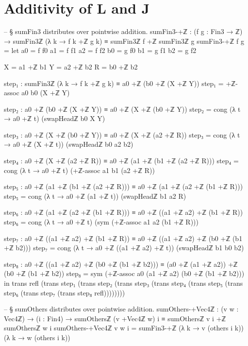 \documentclass[11pt,a4paper]{book}
\def\texorpdfstring#1#2{#2}%
\begin{document}
\section{Additivity of \texorpdfstring{$L$}{L} and \texorpdfstring{$J$}{J}}

\begin{code}
-- § sumFin3 distributes over pointwise addition.
sumFin3-+ℤ : (f g : Fin3 → ℤ) →
  sumFin3ℤ (λ k → f k +ℤ g k) ≡
  sumFin3ℤ f +ℤ sumFin3ℤ g
sumFin3-+ℤ f g =
  let
    a0 = f f0
    a1 = f f1
    a2 = f f2
    b0 = g f0
    b1 = g f1
    b2 = g f2

    X = a1 +ℤ b1
    Y = a2 +ℤ b2
    R = b0 +ℤ b2

    step₁ : sumFin3ℤ (λ k → f k +ℤ g k) ≡ a0 +ℤ (b0 +ℤ (X +ℤ Y))
    step₁ = +ℤ-assoc a0 b0 (X +ℤ Y)

    step₂ : a0 +ℤ (b0 +ℤ (X +ℤ Y)) ≡ a0 +ℤ (X +ℤ (b0 +ℤ Y))
    step₂ = cong (λ t → a0 +ℤ t) (swapHeadℤ b0 X Y)

    step₃ : a0 +ℤ (X +ℤ (b0 +ℤ Y)) ≡ a0 +ℤ (X +ℤ (a2 +ℤ R))
    step₃ = cong (λ t → a0 +ℤ (X +ℤ t)) (swapHeadℤ b0 a2 b2)

    step₄ : a0 +ℤ (X +ℤ (a2 +ℤ R)) ≡ a0 +ℤ (a1 +ℤ (b1 +ℤ (a2 +ℤ R)))
    step₄ = cong (λ t → a0 +ℤ t) (+ℤ-assoc a1 b1 (a2 +ℤ R))

    step₅ : a0 +ℤ (a1 +ℤ (b1 +ℤ (a2 +ℤ R))) ≡ a0 +ℤ (a1 +ℤ (a2 +ℤ (b1 +ℤ R)))
    step₅ = cong (λ t → a0 +ℤ (a1 +ℤ t)) (swapHeadℤ b1 a2 R)

    step₆ : a0 +ℤ (a1 +ℤ (a2 +ℤ (b1 +ℤ R))) ≡ a0 +ℤ ((a1 +ℤ a2) +ℤ (b1 +ℤ R))
    step₆ = cong (λ t → a0 +ℤ t) (sym (+ℤ-assoc a1 a2 (b1 +ℤ R)))

    step₇ : a0 +ℤ ((a1 +ℤ a2) +ℤ (b1 +ℤ R)) ≡ a0 +ℤ ((a1 +ℤ a2) +ℤ (b0 +ℤ (b1 +ℤ b2)))
    step₇ = cong (λ t → a0 +ℤ ((a1 +ℤ a2) +ℤ t)) (swapHeadℤ b1 b0 b2)

    step₈ : a0 +ℤ ((a1 +ℤ a2) +ℤ (b0 +ℤ (b1 +ℤ b2))) ≡ (a0 +ℤ (a1 +ℤ a2)) +ℤ (b0 +ℤ (b1 +ℤ b2))
    step₈ = sym (+ℤ-assoc a0 (a1 +ℤ a2) (b0 +ℤ (b1 +ℤ b2)))
  in
  trans
    refl
    (trans step₁
      (trans step₂
        (trans step₃
          (trans step₄
            (trans step₅
              (trans step₆
                (trans step₇
                  (trans step₈ refl))))))))

-- § sumOthers distributes over pointwise addition.
sumOthers-+Vec4ℤ : (v w : Vec4ℤ) → (i : Fin4) →
  sumOthersℤ (v +Vec4ℤ w) i ≡ sumOthersℤ v i +ℤ sumOthersℤ w i
sumOthers-+Vec4ℤ v w i =
  sumFin3-+ℤ (λ k → v (others i k)) (λ k → w (others i k))
\end{code}
\end{document}
